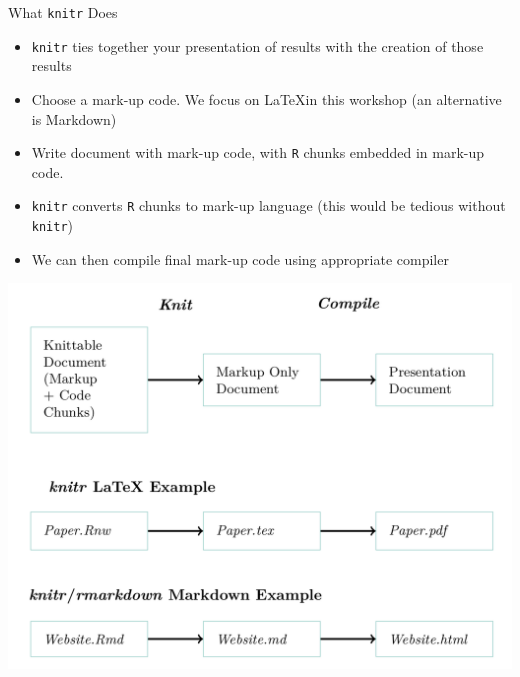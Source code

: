 \documentclass{beamer}\usepackage[]{graphicx}\usepackage[]{color}
\begin{document}
\begin{frame}{What \texttt{knitr} Does}
  \begin{itemize}
  \item \texttt{knitr} ties together your presentation of results with the creation of those results
  \item Choose a mark-up code. We focus on \LaTeX in this workshop (an alternative is Markdown)
  \item Write document with mark-up code, with \texttt{R} chunks embedded in mark-up code.
  \item \texttt{knitr} converts \texttt{R} chunks to mark-up language (this would be tedious without \texttt{knitr})
  \item We can then compile final mark-up code using appropriate compiler
  \end{itemize}
\end{frame}

\begin{frame}
   \begin{center}
     \includegraphics[width=.9\linewidth]{knitrprocess}
   \end{center}
 \end{frame}
\end{document}

